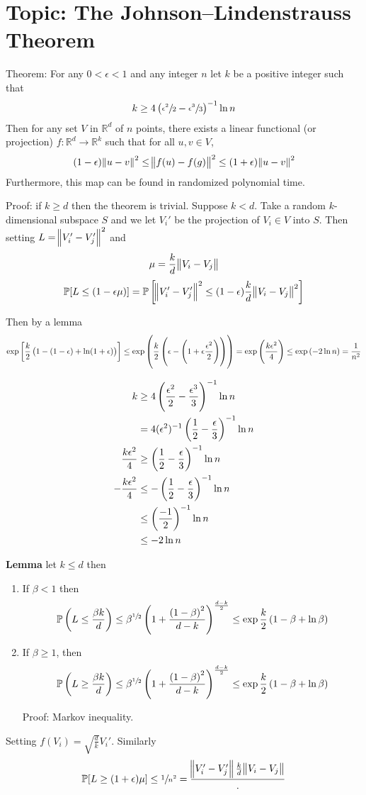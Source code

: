 \documentclass{article}
\newcommand{\RR}{\mathbb{R}}
\begin{document}
\section{Topic: The Johnson–Lindenstrauss Theorem}

Theorem: For any \(0 < \epsilon < 1\) and any integer \(n\) let \(k\) be a positive integer such that
\[k \geq 4\del{\sfrac{\epsilon^2}{2} - \sfrac{\epsilon^3}{3}}^{-1} \ln n\]
Then for any set \(V\) in \(\RR^d\) of \(n\) points, there exists a linear functional (or projection) \(f : \RR^d \to \RR^k\) such that for all \(u, v \in V\),
\[(1-\epsilon)\norm{u-v}^2 \leq \norm{f(u) - f(g)}^2 \leq (1+\epsilon)\norm{u-v}^2\]
Furthermore, this map can be found in randomized polynomial time.

Proof: if \(k \geq d\) then the theorem is trivial.
Suppose \(k < d\).
Take a random \(k\)-dimensional subspace \(S\) and we let \(V_i'\) be the projection of \(V_i \in V\) into \(S\).
Then setting \(L = \norm{V_i' - V_j'}^2\) and
\[\mu = \frac{k}{d} \norm{V_i - V_j}\]
\[\mathbb P[L \leq (1- \epsilon \mu)] = \mathbb P\sbr{\norm{V_i' - V_j'}^2 \leq (1 - \epsilon) \frac{k}{d}\norm{V_i - V_j}^2} \]

Then by a lemma
\[\exp\sbr{\frac{k}{2}\del{1 - (1 - \epsilon) + \ln (1 + \epsilon)}} \leq \exp\del{\frac{k}{2}\del{\epsilon - \del{1 + \epsilon\frac{\epsilon^2}{2}}}} = \exp\del{\frac{k\epsilon^2}{4}} \leq \exp\del{-2\ln n} =\frac{1}{n^2}\]

\begin{align*}
  k &\geq 4\del{\frac{\epsilon^2}{2} - \frac{\epsilon^3}{3}}^{-1}\ln n\\
    &= 4(\epsilon^2)^{-1}\del{\frac{1}{2} - \frac{\epsilon}{3}}^{-1} \ln n\\
  \frac{k\epsilon^2}{4} &\geq \del{\frac{1}{2} - \frac{\epsilon}{3}}^{-1} \ln n\\
  -\frac{k \epsilon^2}{4} &\leq - \del{\frac{1}{2} - \frac{\epsilon}{3}}^{-1}\ln n\\
    & \leq \del{\frac{-1}{2}}^{-1} \ln n\\
  & \leq -2 \ln n
\end{align*}

\textbf{Lemma} let \(k \leq d\) then
\begin{enumerate}
\item If \(\beta < 1\) then
  \[\mathbb P\del{L \leq \frac{\beta k}{d}} \leq \beta^{\sfrac{1}{2}}\del{1 + \frac{\del{1-\beta}^2}{d-k}}^{\frac{d-k}{2}} \leq \exp{\frac{k}{2}\del{1 - \beta + \ln \beta}}\]

\item If \(\beta \geq 1\), then
  \[\mathbb P \del{L \geq \frac{\beta k}{d}} \leq \beta^{\sfrac{1}{2}}\del{1 + \frac{\del{1-\beta}^2}{d-k}}^{\frac{d-k}{2}} \leq \exp{\frac{k}{2}\del{1 - \beta + \ln \beta}}\]

  Proof: Markov inequality.
\end{enumerate}
Setting \(f(V_i) = \sqrt{\frac{d}{k}}V_i'\).
Similarly \[\mathbb P[L \geq (1 + \epsilon)\mu] \leq \sfrac{1}{n^2} = \frac{\norm{V_i' - V_j'}{\frac{k}{d} \norm{V_i - V_j}}}.\]
\end{document}
